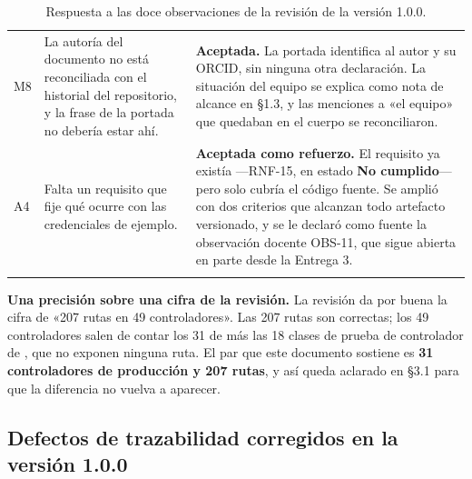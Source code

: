 \documentclass[11pt,a4paper]{article}
\DeclareRobustCommand{\cd}[1]{\texttt{\protect\seqsplit{#1}}}
\newcommand{\estadoN}{\textcolor{rojoko}{\textbf{No cumplido}}}
\begin{document}
\begin{longtable}{p{1.1cm} p{5.3cm} p{8.1cm}}
\addlinespace
M8 & La autoría del documento no está reconciliada con el historial del repositorio, y la frase de
la portada no debería estar ahí. & \textbf{Aceptada.} La portada identifica al autor y su ORCID,
sin ninguna otra declaración. La situación del equipo se explica como nota de alcance en
\S1.3, y las menciones a «el equipo» que quedaban en el cuerpo se reconciliaron. \\
\addlinespace
A4 & Falta un requisito que fije qué ocurre con las credenciales de ejemplo. &
\textbf{Aceptada como refuerzo.} El requisito ya existía ---RNF-15, en estado \estadoN{}--- pero
solo cubría el código fuente. Se amplió con dos criterios que alcanzan todo artefacto versionado,
y se le declaró como fuente la observación docente OBS-11, que sigue abierta en parte desde la
Entrega 3. \\
\bottomrule
\caption{Respuesta a las doce observaciones de la revisión de la versión 1.0.0.}
\end{longtable}

\noindent\textbf{Una precisión sobre una cifra de la revisión.} La revisión da por buena la cifra
de «207 rutas en 49 controladores». Las 207 rutas son correctas; los 49 controladores salen de
contar los 31 de \cd{src/main/java} más las 18 clases de prueba de controlador de
\cd{src/test}, que no exponen ninguna ruta. El par que este documento sostiene es \textbf{31
controladores de producción y 207 rutas}, y así queda aclarado en \S3.1 para que la diferencia no
vuelva a aparecer.

\subsection{Defectos de trazabilidad corregidos en la versión 1.0.0}
\end{document}

